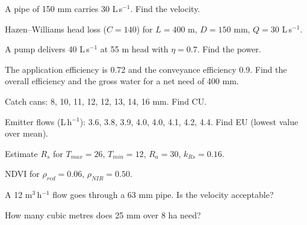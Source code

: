 \begin{exlist}
\item A pipe of 150 mm carries 30 L\,s$^{-1}$. Find the velocity.
\item Hazen--Williams head loss ($C=140$) for $L=400$ m, $D=150$ mm, $Q=30$ L\,s$^{-1}$.
\item A pump delivers 40 L\,s$^{-1}$ at 55 m head with $\eta=0.7$. Find the power.
\item The application efficiency is 0.72 and the conveyance efficiency 0.9. Find the overall efficiency and the gross water for a net need of 400 mm.
\item Catch cans: 8, 10, 11, 12, 12, 13, 14, 16 mm. Find CU.
\item Emitter flows (L\,h$^{-1}$): 3.6, 3.8, 3.9, 4.0, 4.0, 4.1, 4.2, 4.4. Find EU (lowest value over mean).
\item Estimate $R_s$ for $T_{max}=26$, $T_{min}=12$, $R_a=30$, $k_{Rs}=0.16$.
\item NDVI for $\rho_{red}=0.06$, $\rho_{NIR}=0.50$.
\item A 12 m$^3$\,h$^{-1}$ flow goes through a 63 mm pipe. Is the velocity acceptable?
\item How many cubic metres does 25 mm over 8 ha need?
\end{exlist}

